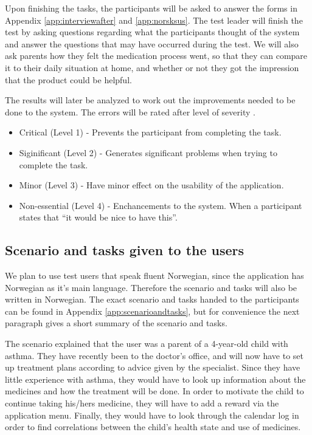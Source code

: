 Upon finishing the tasks, the participants will be asked to answer the forms in Appendix \ref{app:interviewafter} and \ref{app:norsksus}. The test leader will finish the test by asking questions regarding what the participants thought of the system and answer the questions that may have occurred during the test. We will also ask parents how they felt the medication process went, so that they can compare it to their daily situation at home, and whether or not they got the impression that the product could be helpful.  

The results will later be analyzed to work out the improvements needed to be done to the system. The errors will be rated after level of severity \cite{dumas1995practical}. 

\begin{itemize}
\item{Critical (Level 1) - Prevents the participant from completing the task.}
\item{Siginificant (Level 2) - Generates significant problems when trying to complete the task.}
\item{Minor (Level 3) - Have minor effect on the usability of the application.}
\item{Non-essential (Level 4) - Enchancements to the system. When a participant states that ``it would be nice to have this''.}
\end{itemize}



\subsection{Scenario and tasks given to the users}
We plan to use test users that speak fluent Norwegian, since the application has Norwegian as it's main language. Therefore the scenario and tasks will also be written in Norwegian. The exact scenario and tasks handed to the participants can be found in Appendix \ref{app:scenarioandtasks}, but for convenience the next paragraph gives a short summary of the scenario and tasks.

The scenario explained that the user was a parent of a 4-year-old child with asthma. They have recently been to the doctor's office, and will now have to set up treatment plans according to advice given by the specialist. Since they have little experience with asthma, they would have to look up information about the medicines and how the treatment will be done. In order to motivate the child to continue taking his/hers medicine, they will have to add a reward via the application menu. Finally, they would have to look through the calendar log in order to find correlations between the child's health state and use of medicines. 